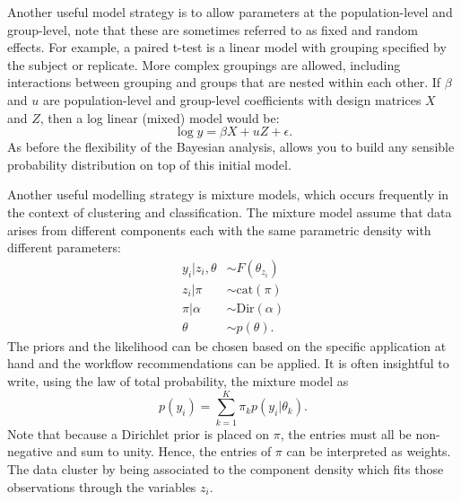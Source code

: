 \documentclass[12pt,english]{article}
\begin{document}
Another useful model strategy is to allow parameters at the population-level and group-level, note that these are sometimes referred to as fixed and random effects. For example, a paired t-test is a linear model with grouping specified by the subject or replicate. More complex groupings are allowed, including interactions between grouping and groups that are nested within each other. If $\beta$ and $u$ are population-level and group-level coefficients with design matrices $X$ and $Z$, then a log linear (mixed) model would be:
\begin{equation}
\log y = \beta X + u Z + \epsilon.
\end{equation}
As before the flexibility of the Bayesian analysis, allows you to build any sensible probability distribution on top of this initial model. 

Another useful modelling strategy is mixture models, which occurs frequently in the context of clustering and classification. The mixture model assume that data arises from different components each with the same parametric density with different parameters:
\begin{equation}
\begin{split}
y_i|z_i,\theta &\sim F(\theta_{z_i})\\
z_i|\pi & \sim \text{cat}(\pi)\\
\pi|\alpha & \sim \text{Dir}(\alpha)\\
\theta & \sim p(\theta).
\end{split}	
\end{equation}
The priors and the likelihood can be chosen based on the specific application at hand and the workflow recommendations can be applied. It is often insightful to write, using the law of total probability, the mixture model as
\begin{equation}
p(y_i) = \sum_{k = 1}^{K} \pi_k p(y_i|\theta_k).
\end{equation}  
Note that because a Dirichlet prior is placed on $\pi$, the entries must all be non-negative and sum to unity. Hence, the entries of $\pi$ can be interpreted as weights. The data cluster by being associated to the component density which fits those observations through the variables $z_i$.
\end{document}
